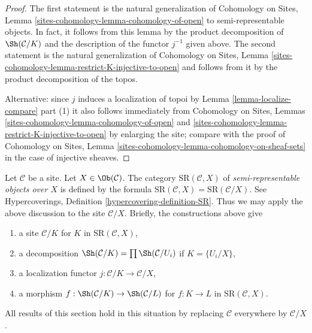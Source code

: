 \begin{proof}
The first statement is the natural generalization of
Cohomology on Sites, Lemma
\ref{sites-cohomology-lemma-cohomology-of-open}
to semi-representable objects.
In fact, it follows from this lemma
by the product decomposition of $\Sh(\mathcal{C}/K)$
and the description of the functor $j^{-1}$ given above.
The second statement is the natural generalization of
Cohomology on Sites, Lemma
\ref{sites-cohomology-lemma-restrict-K-injective-to-open}
and follows from it by the product decomposition of the topos.

\medskip\noindent
Alternative: since $j$ induces a localization of topoi by
Lemma \ref{lemma-localize-compare} part (1)
it also follows immediately from
Cohomology on Sites, Lemmas \ref{sites-cohomology-lemma-cohomology-of-open}
and \ref{sites-cohomology-lemma-restrict-K-injective-to-open}
by enlarging the site; compare with the proof of
Cohomology on Sites, Lemma
\ref{sites-cohomology-lemma-cohomology-on-sheaf-sets}
in the case of injective sheaves.
\end{proof}

\begin{remark}
\label{remark-semi-representable-over-object}
Let $\mathcal{C}$ be a site. Let $X \in \Ob(\mathcal{C})$.
The category $\text{SR}(\mathcal{C}, X)$
of {\it semi-representable objects over $X$}
is defined by the formula
$\text{SR}(\mathcal{C}, X) = \text{SR}(\mathcal{C}/X)$.
See Hypercoverings, Definition \ref{hypercovering-definition-SR}.
Thus we may apply the above discussion to the site
$\mathcal{C}/X$. Briefly, the constructions above give
\begin{enumerate}
\item a site $\mathcal{C}/K$ for $K$ in $\text{SR}(\mathcal{C}, X)$,
\item a decomposition
$\Sh(\mathcal{C}/K) = \prod \Sh(\mathcal{C}/U_i)$ if $K = \{U_i/X\}$,
\item a localization functor $j : \mathcal{C}/K \to \mathcal{C}/X$,
\item a morphism $f : \Sh(\mathcal{C}/K) \to \Sh(\mathcal{C}/L)$
for $f : K \to L$ in $\text{SR}(\mathcal{C}, X)$.
\end{enumerate}
All results of this section hold in this situation by replacing
$\mathcal{C}$ everywhere by $\mathcal{C}/X$.
\end{remark}

